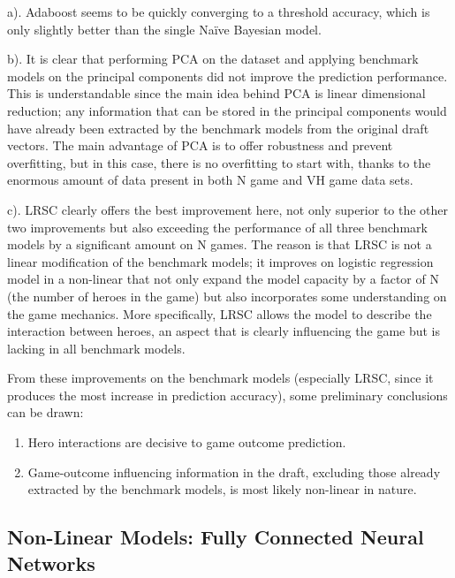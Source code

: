 \documentclass{article}
\begin{document}
a). Adaboost seems to be quickly converging to a threshold accuracy, which is only slightly better than the single Naïve Bayesian model.


b). It is clear that performing PCA on the dataset and applying benchmark models on the principal components did not improve the prediction performance. This is understandable since the main idea behind PCA is linear dimensional reduction; any information that can be stored in the principal components would have already been extracted by the benchmark models from the original draft vectors. The main advantage of PCA is to offer robustness and prevent overfitting, but in this case, there is no overfitting to start with, thanks to the enormous amount of data present in both N game and VH game data sets.


c). LRSC clearly offers the best improvement here, not only superior to the other two improvements but also exceeding the performance of all three benchmark models by a significant amount on N games. The reason is that LRSC is not a linear modification of the benchmark models; it improves on logistic regression model in a non-linear that not only expand the model capacity by a factor of N (the number of heroes in the game) but also incorporates some understanding on the game mechanics. More specifically, LRSC allows the model to describe the interaction between heroes, an aspect that is clearly influencing the game but is lacking in all benchmark models.

From these improvements on the benchmark models (especially LRSC, since it produces the most increase in prediction accuracy), some preliminary conclusions can be drawn:
\begin{enumerate}
    \item Hero interactions are decisive to game outcome prediction.
    \item Game-outcome influencing information in the draft, excluding those already extracted by the benchmark models, is most likely non-linear in nature.
\end{enumerate}

\subsection{Non-Linear Models: Fully Connected Neural Networks}
\end{document}
